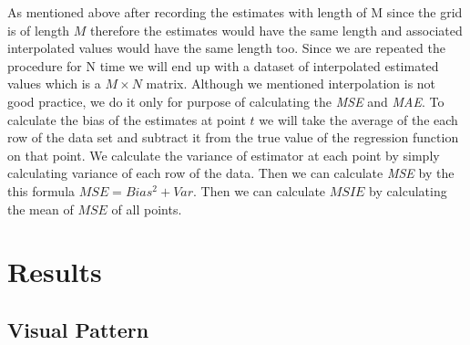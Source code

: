 \documentclass[12pt,twoside, a4paper]{reedthesis}
\begin{document}
As mentioned above after recording the estimates with length of M since the grid is of length \(M\) therefore the estimates would have the same length and associated interpolated values would have the same length too. Since we are repeated the procedure for N time we will end up with a dataset of interpolated estimated values which is a \(M\times N\) matrix. Although we mentioned interpolation is not good practice, we do it only for purpose of calculating the \emph{MSE} and \emph{MAE}. To calculate the bias of the estimates at point \(t\) we will take the average of the each row of the data set and subtract it from the true value of the regression function on that point. We calculate the variance of estimator at each point by simply calculating variance of each row of the data. Then we can calculate \emph{MSE} by the this formula \(MSE=Bias^2+Var\). Then we can calculate \(MSIE\) by calculating the mean of \(MSE\) of all points.

\hypertarget{results}{%
\chapter{Results}\label{results}}

\hypertarget{visual-pattern}{%
\section{Visual Pattern}\label{visual-pattern}}
\end{document}
